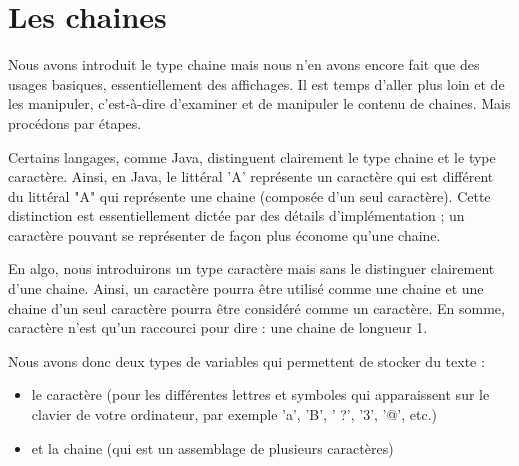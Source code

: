 \documentclass[11pt,a4paper]{article}
\begin{document}
            \section{Les chaines}
        Nous avons introduit le type chaine mais nous n'en avons encore fait
        que des usages basiques, essentiellement des affichages. Il est temps d'aller plus loin et de les
        manipuler, c'est-\`a-dire d'examiner et de manipuler le contenu de chaines. Mais proc\'edons
        par \'etapes.
      
            \par
        
        Certains langages, comme Java, distinguent clairement le type chaine et le type caract\`ere.
        Ainsi, en Java, le litt\'eral 'A' repr\'esente un caract\`ere qui est diff\'erent du litt\'eral "A" qui
        repr\'esente une chaine (compos\'ee d'un seul caract\`ere). Cette distinction est essentiellement
        dict\'ee par des d\'etails d'impl\'ementation ; un caract\`ere pouvant se repr\'esenter de fa\c con plus
        \'econome qu'une chaine.
      
            \par
        
        En algo, nous introduirons un type caract\`ere mais sans le distinguer clairement d'une chaine.
        Ainsi, un caract\`ere pourra \^etre utilis\'e comme une chaine et une chaine d'un seul caract\`ere
        pourra \^etre consid\'er\'e comme un caract\`ere. En somme, caract\`ere n'est qu'un raccourci pour
        dire : une chaine de longueur 1.
      
            \par
        
        Nous avons donc deux types de variables qui permettent de stocker du texte :
        
					\begin{itemize}
				
			\item 
            le caract\`ere (pour les diff\'erentes lettres et symboles qui apparaissent sur le clavier de votre
            ordinateur, par exemple 'a', 'B', ' ?', '3', '@', etc.) 
          
			\item et la chaine (qui est un assemblage de plusieurs caract\`eres)
					\end{itemize}
				
            \par
        
\end{document}

